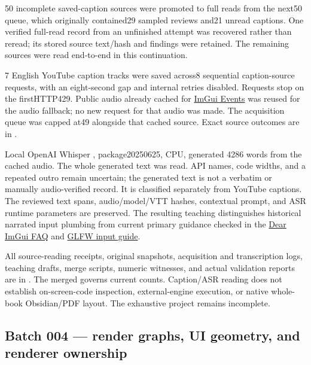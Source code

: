 \hypertarget{appendix-877738f6f4d2-batch-003-resumed-reading-sequential-acquisition-and-audio-asr}{}

50 incomplete saved-caption sources were promoted to full reads from the next50 queue, which originally contained29 sampled reviews and21 unread captions. One verified full-read record from an unfinished attempt was recovered rather than reread; its stored source text/hash and findings were retained. The remaining sources were read end-to-end in this continuation.

7 English YouTube caption tracks were saved across8 sequential caption-source requests, with an eight-second gap and internal retries disabled. Requests stop on the firstHTTP429. Public audio already cached for \href{https://www.youtube.com/watch?v=yBP1gSbQPPM}{ImGui Events} was reused for the audio fallback; no new request for that audio was made. The acquisition queue was capped at49 alongside that cached source. Exact source outcomes are in .

Local OpenAI Whisper , package20250625, CPU, generated 4286 words from the cached audio. The whole generated text was read. API names, code widths, and a repeated outro remain uncertain; the generated text is not a verbatim or manually audio-verified record. It is classified separately from YouTube captions. The reviewed text spans, audio/model/VTT hashes, contextual prompt, and ASR runtime parameters are preserved. The resulting teaching distinguishes historical narrated input plumbing from current primary guidance checked in the \href{https://github.com/ocornut/imgui/blob/master/docs/FAQ.md}{Dear ImGui FAQ} and \href{https://www.glfw.org/docs/latest/input_guide.html}{GLFW input guide}.

All source-reading receipts, original snapshots, acquisition and transcription logs, teaching drafts, merge scripts, numeric witnesses, and actual validation reports are in . The merged  governs current counts. Caption/ASR reading does not establish on-screen-code inspection, external-engine execution, or native whole-book Obsidian/PDF layout. The exhaustive project remains incomplete.

\subsection{Batch 004 --- render graphs, UI geometry, and renderer ownership}\label{appendix-877738f6f4d2-batch-004-render-graphs-ui-geometry-and-renderer-ownership}

